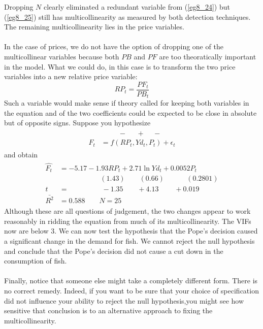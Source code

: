 \documentclass[11pt]{article}
\begin{document}
Dropping $N$ clearly eliminated a redundant variable from (\ref{eg8_24}) but (\ref{eg8_25}) still has multicollinearity as measured by both detection techniques. The remaining multicollinearity lies in the price variables. \\ \\
In the case of prices, we do not have the option of dropping one of the multicollinear variables because both $PB$ and $PF$ are too theoratically important in the model. What we could do, in this case is to transform the two price variables into a new relative price variable: 
$$RP_t = \frac{PF_t}{PB_t}$$
Such a variable would make sense if theory called for keeping both variables in the equation and of the two coefficients could be expected to be close in absolute but of opposite signs. Suppose you hypothesize
\begin{align*}
\begin{split}
& \>\>\>\>\>\>\>\>\>\>\>-\>\>\>\>\>\>+\>\>\>\>\>-\\
F_t &= f(RP_t, Yd_t, P_t) + \epsilon_t
\end{split}
\end{align*}
and obtain
\begin{align}
\label{eg8_26}
\begin{split}
\hat{F_t} &= -5.17 - 1.93RP_t + 2.71\ln Yd_t + 0.0052P_t\\
&\>\>\>\>\>\>\>\>\>\>\>\>\>\>\>\>\>\>\>\>\>\>\>\>\>\> (1.43) 
\>\>\>\>\>\>\>\>\> (0.66)
\>\>\>\>\>\>\>\>\>\>\>\>\>\> (0.2801)\\
t&=\>\>\>\>\>\>\>\>\>\>\>\>\>\>\>\>\>\>\>\>\> -1.35
\>\>\>\>\>\>\>\>\> +4.13
\>\>\>\>\>\>\>\>\>\> +0.019\\
\bar{R^2}&= 0.588 \quad\quad N=25
\end{split}
\end{align}
Although these are all questions of judgement, the two changes appear to work reasonably in ridding the equation from much of its multicollinearity. The VIFs now are below 3. We can now test the hypothesis that the Pope's decision caused a significant change in the demand for fish. We cannot reject the null hypothesis and conclude that the Pope's decision did not cause a cut down in the consumption of fish. \\ \\
Finally, notice that someone else might take a completely different form. There is no correct remedy. Indeed, if you want to be sure that your choice of specification did not influence your ability to reject the null hypothesis,you might see how sensitive that conclusion is to an alternative approach to fixing the multicollinearity.
\clearpage
\end{document}
